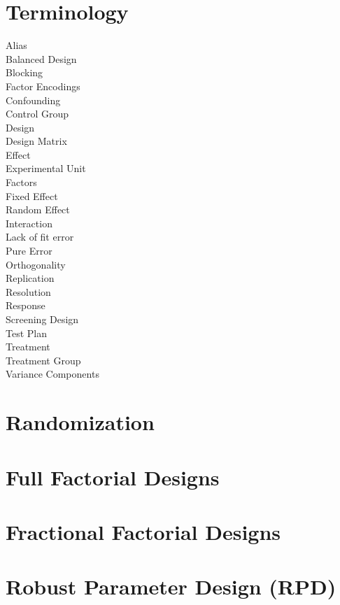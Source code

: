 \documentclass[12pt,a4paper]{report}
\begin{document}
\section{Terminology}
\begin{description}
\item [Alias]
\item [Balanced Design]
\item [Blocking]
\item [Factor Encodings]
\item [Confounding]
\item [Control Group]
\item [Design]
\item [Design Matrix]
\item [Effect]
\item [Experimental Unit]
\item [Factors]
\item [Fixed Effect]
\item [Random Effect]
\item [Interaction]
\item [Lack of fit error]
\item [Pure Error]
\item [Orthogonality]
\item [Replication]
\item [Resolution]
\item [Response]
\item [Screening Design]
\item [Test Plan]
\item [Treatment]
\item [Treatment Group]
\item [Variance Components]
\end{description}

\section{Randomization}

\section{Full Factorial Designs}
\section{Fractional Factorial Designs}
\section{Robust Parameter Design (RPD)}
\end{document}
